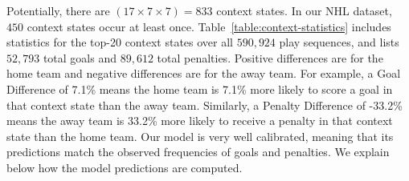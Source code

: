 \documentclass[]{article}
\begin{document}
Potentially, there are $(17 \times 7 \times 7) = 833$ context states. In our NHL dataset, $450$  context states occur at least once.
Table~\ref{table:context-statistics} includes statistics for the top-20 context states over all $590,924$ play sequences, and lists $52,793$ total goals and $89,612$ total penalties.
Positive differences are for the home team and negative differences are for the away team. For example, a Goal Difference of 7.1\% means the home team is 7.1\% more likely to score a goal in that context state than the away team. Similarly, a Penalty Difference of -33.2\% means the away team is 33.2\% more likely to receive a penalty in that context state than the home team. Our model is very well calibrated, meaning that its predictions match the observed frequencies of goals and penalties. We explain below how the model predictions are computed.
\end{document}

